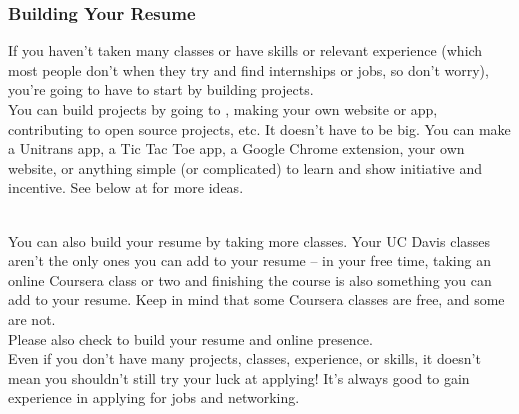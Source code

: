 \documentclass{article}
\begin{document}
\subsubsection {Building Your Resume}
\hspace{0.5cm} If you haven't taken many classes or have skills or relevant experience (which most people don't when they try and find internships or jobs, so don't worry), you're going to have to start by building projects. \\

You can build projects by going to , making your own website or app, contributing to open source projects, etc. It doesn't have to be big. You can make a Unitrans app, a Tic Tac Toe app, a Google Chrome extension, your own website, or anything simple (or complicated) to learn and show initiative and incentive. See below at  for more ideas. \\\

You can also build your resume by taking more classes. Your UC Davis classes aren't the only ones you can add to your resume -- in your free time, taking an online Coursera class or two and finishing the course is also something you can add to your resume. Keep in mind that some Coursera classes are free, and some are not. \\

Please also check  to build your resume and online presence. \\

Even if you don't have many projects, classes, experience, or skills, it doesn't mean you shouldn't still try your luck at applying! It's always good to gain experience in applying for jobs and networking.  
\end{document}
